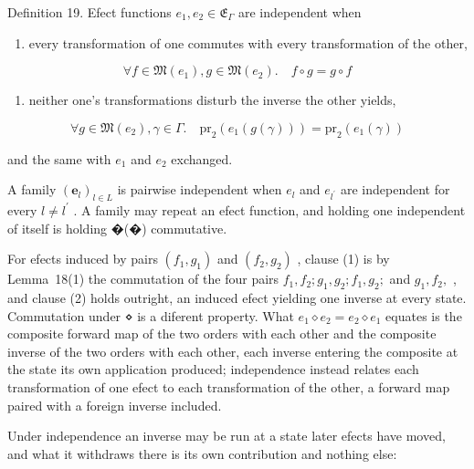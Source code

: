 \documentclass[
  10
]{article}
\providecommand{\tightlist}{%
  \setlength{\itemsep}{0pt}\setlength{\parskip}{0pt}}
\begin{document}
Definition 19. Efect functions
\(e _ { 1 } , e _ { 2 } \in \mathfrak { E } _ { \Gamma }\) are
independent when

\begin{enumerate}
\def\labelenumi{\arabic{enumi}.}
\tightlist
\item
  every transformation of one commutes with every transformation of the
  other,
\end{enumerate}

\[
\forall f \in \mathfrak { M } ( e _ { 1 } ) , g \in \mathfrak { M } ( e _ { 2 } ) . \quad f \circ g = g \circ f\tag{18}
\]

\begin{enumerate}
\def\labelenumi{\arabic{enumi}.}
\setcounter{enumi}{1}
\tightlist
\item
  neither one's transformations disturb the inverse the other yields,
\end{enumerate}

\[
\forall g \in \mathfrak { M } ( e _ { 2 } ) , \gamma \in \Gamma . \quad \mathrm { p r } _ { 2 } ( e _ { 1 } ( g ( \gamma ) ) ) = \mathrm { p r } _ { 2 } ( e _ { 1 } ( \gamma ) )\tag{19}
\]

and the same with \(e _ { 1 }\) and \(e _ { 2 }\) exchanged.

A family \(\left( \boldsymbol { e } _ { l } \right) _ { l \in L }\) is
pairwise independent when \(e _ { l }\) and \(e _ { l ^ { \prime } }\)
are independent for every
\({ \mathit { l } } \neq { \mathit { l } } ^ { \prime }\) . A family may
repeat an efect function, and holding one independent of itself is
holding �(�) commutative.

For efects induced by pairs \(( f _ { 1 } , g _ { 1 } )\) and
\(\left( f _ { 2 } , g _ { 2 } \right)\) , clause (1) is by Lemma~18(1)
the commutation of the four pairs
\(f _ { 1 } , f _ { 2 } ; g _ { 1 } , g _ { 2 } ; f _ { 1 } , g _ { 2 } ;\)
and \(g _ { 1 } , f _ { 2 } ,\) , and clause (2) holds outright, an
induced efect yielding one inverse at every state. Commutation under ⋄
is a diferent property. What
\(e _ { 1 } \diamond e _ { 2 } = e _ { 2 } \diamond e _ { 1 }\) equates
is the composite forward map of the two orders with each other and the
composite inverse of the two orders with each other, each inverse
entering the composite at the state its own application produced;
independence instead relates each transformation of one efect to each
transformation of the other, a forward map paired with a foreign inverse
included.

Under independence an inverse may be run at a state later efects have
moved, and what it withdraws there is its own contribution and nothing
else:
\end{document}
